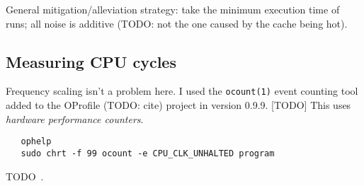 General mitigation/alleviation strategy: take the minimum execution time of  runs; all noise is additive (TODO: not the one caused by the cache being hot).

\subsection{Measuring CPU cycles}
\label{app:cycles}

Frequency scaling isn't a problem here.  I used the \texttt{ocount(1)} event
counting tool added to the OProfile (TODO: cite) project in version 0.9.9.  [TODO] This
uses \emph{hardware performance counters}.

\begin{verbatim}
   ophelp
   sudo chrt -f 99 ocount -e CPU_CLK_UNHALTED program
\end{verbatim}

TODO~\cite[78\psqq]{drepper2007}.



